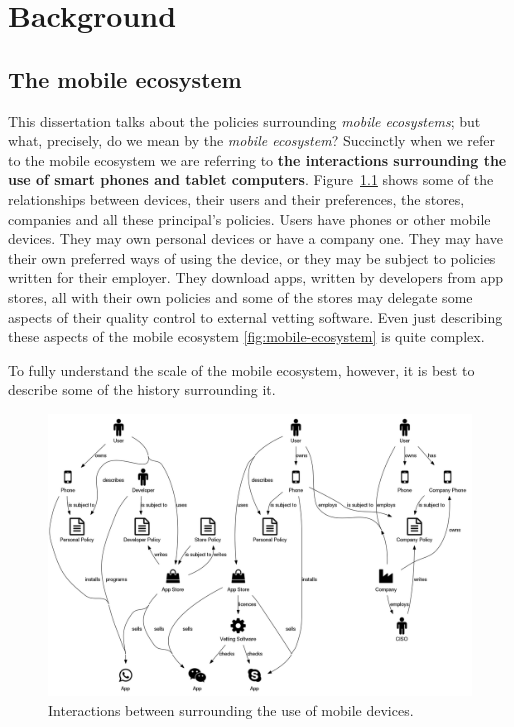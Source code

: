 \documentclass[thesis.tex]{subfiles}
\begin{document}
\chapter{Background}

\section{The mobile ecosystem}\label{sec:mobile-ecosystem}

This dissertation talks about the policies surrounding \emph{mobile
ecosystems}; but what, precisely, do we mean by the \emph{mobile
ecosystem}?  Succinctly when we refer to the mobile ecosystem we are
referring to \textbf{the interactions surrounding the use of smart
phones and tablet computers}.  Figure~\ref{fig:mobile-ecosystem} shows
some of the relationships between devices, their users and their
preferences, the stores, companies and all these principal's
policies. Users have phones or other mobile devices.  They may own
personal devices or have a company one.  They may have their own
preferred ways of using the device, or they may be subject to policies
written for their employer.  They download apps, written by developers
from app stores, all with their own policies and some of the stores
may delegate some aspects of their quality control to external vetting
software.  Even just describing these aspects of the mobile ecosystem
\autoref{fig:mobile-ecosystem} is quite complex.

To fully understand the scale of the mobile ecosystem, however, it is
best to describe some of the history surrounding it.

\begin{figure}
  \centering
  \includegraphics[width=\linewidth]{figures/mobile-ecosystem.png}
  \caption{Interactions between surrounding the use of mobile devices.}
  \label{fig:mobile-ecosystem}
\end{figure}
\end{document}
